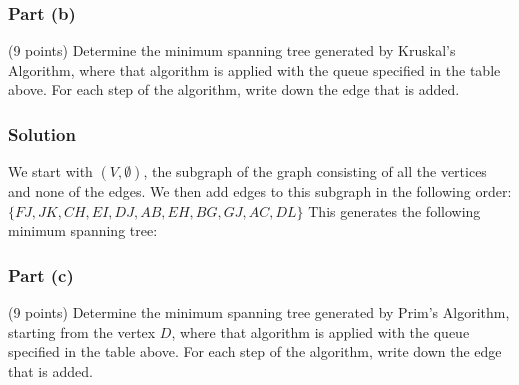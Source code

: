 \documentclass[12pt]{article}
\begin{document}
\pagebreak
\subsubsection*{Part (b)}

(9 points) Determine the minimum spanning tree generated by Kruskal's Algorithm, where that algorithm is applied with the queue specified in the table above.
For each step of the algorithm, write down the edge that is added.

\subsubsection*{Solution}

We start with $(V, \emptyset)$, the subgraph of the graph consisting of all the vertices and none of the edges.
We then add edges to this subgraph in the following order:
$\{ FJ, JK, CH, EI, DJ, AB, EH, BG, GJ, AC, DL \}$
This generates the following minimum spanning tree:


\pagebreak
\subsubsection*{Part (c)}

(9 points) Determine the minimum spanning tree generated by Prim's Algorithm, starting from the vertex $D$, where that algorithm is applied with the queue specified in the table above.
For each step of the algorithm, write down the edge that is added.
\end{document}
